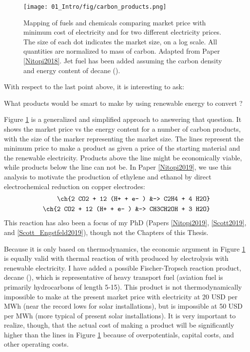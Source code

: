 \begin{figure}[h!]
	\centering
	\texttt{[image: 01\_Intro/fig/carbon\_products.png]}
	\caption{Mapping of fuels and chemicals comparing market price with minimum cost of electricity and  for two different electricity prices. The size of each dot indicates the market size, on a log scale. All quantities are normalized to mass of carbon. Adapted from Paper \ref{Nitopi2018}. Jet fuel has been added assuming the carbon density and energy content of decane ().}
	\label{fig:products}
\end{figure}

With respect to the last point above, it is interesting to ask: 
\begin{question}
	What products would be smart to make by using renewable energy to convert ?
\end{question}
Figure \ref{fig:products} is a generalized and simplified approach to answering that question. It shows the market price vs the energy content for a number of carbon products, with the size of the marker representing the market size. The lines represent the minimum price to make a product as given a price of the  starting material and the renewable electricity. Products above the line might be economically viable, while products below the line can not be. In Paper \ref{Nitopi2019}, we use this analysis to motivate the production of ethylene and ethanol by direct electrochemical  reduction on copper electrodes:
\begin{align}
\ch{2 CO2 + 12 (H+ + e- ) &-> C2H4 + 4 H2O}\\
\ch{2 CO2 + 12 (H+ + e- ) &-> CH3CH2OH + 3 H2O}
\end{align}
This reaction has also been a focus of my PhD (Papers \ref{Nitopi2019}, \ref{Scott2019}, and \ref{Scott_Engstfeld2019}), though not the Chapters of this Thesis.

Because it is only based on thermodynamics, the economic argument in Figure \ref{fig:products} is equally valid with thermal reaction of  with  produced by electrolysis with renewable electricity. I have added a possible Fischer-Tropsch reaction product, decane (), which is representative of heavy transport fuel (aviation fuel is primarily hydrocarbons of length 5-15). This product is not thermodynamically impossible to make at the present market price with electricity at 20 USD per MWh (near the record lows for solar installations), but is impossible at 50 USD per MWh (more typical of present solar installations). It is very important to realize, though, that the actual cost of making a product will be significantly higher than the lines in Figure \ref{fig:products} because of overpotentials, capital costs, and other operating costs.

